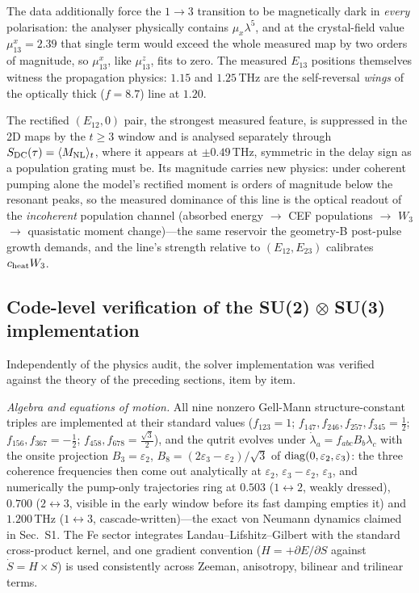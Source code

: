 \documentclass[11pt,a4paper]{article}
\newcommand{\Mnl}{M_{\rm NL}}
\begin{document}
The data additionally force the $1\!\to\!3$ transition to be
magnetically dark in \emph{every} polarisation: the analyser physically
contains $\mu_x\lambda^5$, and at the crystal-field value
$\mu^x_{13}=2.39$ that single term would exceed the whole measured map
by two orders of magnitude, so $\mu^x_{13}$, like $\mu^z_{13}$, fits to
zero.  The measured $E_{13}$ positions themselves witness the
propagation physics: $1.15$ and $1.25$\,THz are the self-reversal
\emph{wings} of the optically thick ($f=8.7$) line at $1.20$.

The rectified $(E_{12},0)$ pair, the strongest measured feature, is
suppressed in the 2D maps by the $t\geq3$ window and is analysed
separately through $S_{\rm DC}(\tau)=\langle\Mnl\rangle_t$, where it
appears at $\pm0.49$\,THz, symmetric in the delay sign as a population
grating must be.  Its magnitude carries new physics: under coherent
pumping alone the model's rectified moment is orders of magnitude below
the resonant peaks, so the measured dominance of this line is the
optical readout of the \emph{incoherent} population channel (absorbed
energy $\to$ CEF populations $\to$ $W_3$ $\to$ quasistatic moment
change)---the same reservoir the geometry-B post-pulse growth demands,
and the line's strength relative to $(E_{12},E_{23})$ calibrates
$c_{\rm heat}W_3$.

\subsection{Code-level verification of the SU(2)$\,\otimes\,$SU(3) implementation}
\label{sec:codeaudit}

Independently of the physics audit, the solver implementation was
verified against the theory of the preceding sections, item by item.

\emph{Algebra and equations of motion.}  All nine nonzero Gell-Mann
structure-constant triples are implemented at their standard values
($f_{123}=1$; $f_{147},f_{246},f_{257},f_{345}=\tfrac12$;
$f_{156},f_{367}=-\tfrac12$; $f_{458},f_{678}=\tfrac{\sqrt3}{2}$),
and the qutrit evolves under
$\dot\lambda_a=f_{abc}B_b\lambda_c$ with the onsite projection
$B_3=\varepsilon_2$, $B_8=(2\varepsilon_3-\varepsilon_2)/\sqrt3$ of
${\rm diag}(0,\varepsilon_2,\varepsilon_3)$: the three coherence
frequencies then come out analytically at $\varepsilon_2$,
$\varepsilon_3-\varepsilon_2$, $\varepsilon_3$, and numerically the
pump-only trajectories ring at $0.503$ ($1\!\leftrightarrow\!2$,
weakly dressed), $0.700$ ($2\!\leftrightarrow\!3$, visible in the
early window before its fast damping empties it) and $1.200$\,THz
($1\!\leftrightarrow\!3$, cascade-written)---the exact von Neumann
dynamics claimed in Sec.~S1.  The Fe sector integrates
Landau--Lifshitz--Gilbert with the standard cross-product kernel, and
one gradient convention ($H=+\partial E/\partial S$ against
$\dot S=H\times S$) is used consistently across Zeeman, anisotropy,
bilinear and trilinear terms.
\end{document}
